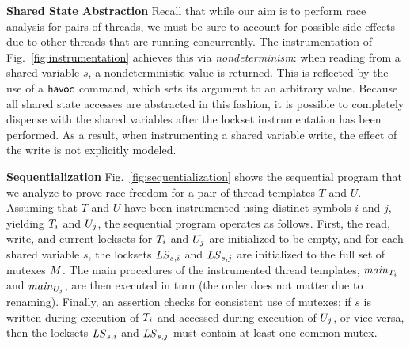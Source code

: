 \noindent\textbf{Shared State Abstraction }
%
Recall that while our aim is to perform race analysis for pairs of threads, we must be sure to account for possible side-effects due to other threads that are running concurrently.  The instrumentation of Fig.~\ref{fig:instrumentation} achieves this via \emph{nondeterminism}: when reading from a shared variable $s$, a nondeterministic value is returned.  This is reflected by the use of a $\mathsf{havoc}$ command, which sets its argument to an arbitrary value.  Because all shared state accesses are abstracted in this fashion, it is possible to completely dispense with the shared variables after the lockset instrumentation has been performed.  As a result, when instrumenting a shared variable write, the effect of the write is not explicitly modeled.

\noindent\textbf{Sequentialization }
%
Fig.~\ref{fig:sequentialization} shows the sequential program that we analyze to prove race-freedom for a pair of thread templates $T$ and $U$. Assuming that $T$ and $U$ have been instrumented using distinct symbols $i$ and $j$, yielding $T_{i}$ and $U_{j}$, the sequential program operates as follows. First, the read, write, and current locksets for $T_{i}$ and $U_{j}$ are initialized to be empty, and for each shared variable $s$, the locksets $\mathit{LS}_{s,i}$ and $\mathit{LS}_{s,j}$ are initialized to the full set of mutexes $M$.  The main procedures of the instrumented thread templates, $\mathit{main}_{T_{i}}$ and $\mathit{main}_{U_{j}}$, are then executed in turn (the order does not matter due to renaming). Finally, an assertion checks for consistent use of mutexes: if $s$ is written during execution of $T_{i}$ and accessed during execution of $U_{j}$, or vice-versa, then the locksets $\mathit{LS}_{s,i}$ and $\mathit{LS}_{s,j}$ must contain at least one common mutex.

